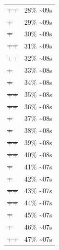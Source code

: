 \documentclass[12pt]{article}
\begin{document}
\begin{center}
\begin{tabular}{ll}
\sout{\sout{\sout{\sout{\sout{\sout{++}}}}}} & 28\% \textasciitilde{}09s\\
\sout{\sout{\sout{\sout{\sout{\sout{\sout{+}}}}}}} & 29\% \textasciitilde{}09s\\
\sout{\sout{\sout{\sout{\sout{\sout{\sout{+}}}}}}} & 30\% \textasciitilde{}09s\\
\sout{\sout{\sout{\sout{\sout{\sout{\sout{++}}}}}}} & 31\% \textasciitilde{}09s\\
\sout{\sout{\sout{\sout{\sout{\sout{\sout{++}}}}}}} & 32\% \textasciitilde{}08s\\
\sout{\sout{\sout{\sout{\sout{\sout{\sout{\sout{+}}}}}}}} & 33\% \textasciitilde{}08s\\
\sout{\sout{\sout{\sout{\sout{\sout{\sout{\sout{+}}}}}}}} & 34\% \textasciitilde{}08s\\
\sout{\sout{\sout{\sout{\sout{\sout{\sout{\sout{++}}}}}}}} & 35\% \textasciitilde{}08s\\
\sout{\sout{\sout{\sout{\sout{\sout{\sout{\sout{++}}}}}}}} & 36\% \textasciitilde{}08s\\
\sout{\sout{\sout{\sout{\sout{\sout{\sout{\sout{\sout{+}}}}}}}}} & 37\% \textasciitilde{}08s\\
\sout{\sout{\sout{\sout{\sout{\sout{\sout{\sout{\sout{+}}}}}}}}} & 38\% \textasciitilde{}08s\\
\sout{\sout{\sout{\sout{\sout{\sout{\sout{\sout{\sout{++}}}}}}}}} & 39\% \textasciitilde{}08s\\
\sout{\sout{\sout{\sout{\sout{\sout{\sout{\sout{\sout{++}}}}}}}}} & 40\% \textasciitilde{}08s\\
\sout{\sout{\sout{\sout{\sout{\sout{\sout{\sout{\sout{\sout{+}}}}}}}}}} & 41\% \textasciitilde{}07s\\
\sout{\sout{\sout{\sout{\sout{\sout{\sout{\sout{\sout{\sout{+}}}}}}}}}} & 42\% \textasciitilde{}07s\\
\sout{\sout{\sout{\sout{\sout{\sout{\sout{\sout{\sout{\sout{++}}}}}}}}}} & 43\% \textasciitilde{}07s\\
\sout{\sout{\sout{\sout{\sout{\sout{\sout{\sout{\sout{\sout{++}}}}}}}}}} & 44\% \textasciitilde{}07s\\
\sout{\sout{\sout{\sout{\sout{\sout{\sout{\sout{\sout{\sout{\sout{+}}}}}}}}}}} & 45\% \textasciitilde{}07s\\
\sout{\sout{\sout{\sout{\sout{\sout{\sout{\sout{\sout{\sout{\sout{+}}}}}}}}}}} & 46\% \textasciitilde{}07s\\
\sout{\sout{\sout{\sout{\sout{\sout{\sout{\sout{\sout{\sout{\sout{++}}}}}}}}}}} & 47\% \textasciitilde{}07s\\

\end{tabular}
\end{center}
\end{document}
